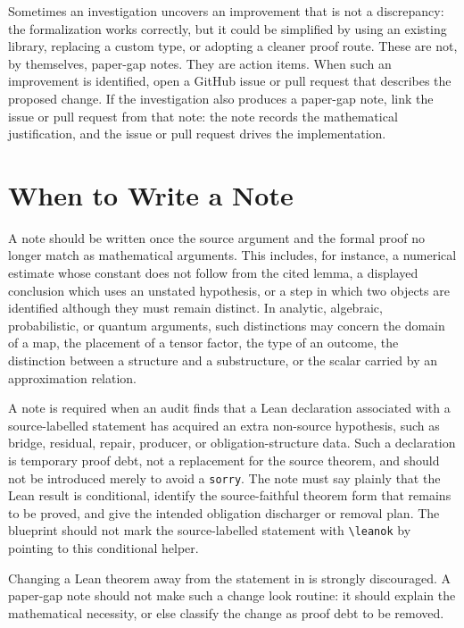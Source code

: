 \documentclass[11pt]{article}
\begin{document}
Sometimes an investigation uncovers an improvement that is not a discrepancy:
the formalization works correctly, but it could be simplified by using an
existing library, replacing a custom type, or adopting a cleaner proof route.
These are not, by themselves, paper-gap notes.  They are action items.  When
such an improvement is identified, open a GitHub issue or pull request that
describes the proposed change.  If the investigation also produces a paper-gap
note, link the issue or pull request from that note: the note records the
mathematical justification, and the issue or pull request drives the
implementation.

\section{When to Write a Note}

A note should be written once the source argument and the formal proof no longer
match as mathematical arguments.  This includes, for instance, a numerical
estimate whose constant does not follow from the cited lemma, a displayed
conclusion which uses an unstated hypothesis, or a step in which two objects are
identified although they must remain distinct.  In analytic, algebraic,
probabilistic, or quantum arguments, such distinctions may concern the domain of
a map, the placement of a tensor factor, the type of an outcome, the distinction
between a structure and a substructure, or the scalar carried by an approximation
relation.

A note is required when an audit finds that a Lean declaration associated with a
source-labelled statement has acquired an extra non-source hypothesis, such as
bridge, residual, repair, producer, or obligation-structure data.  Such a
declaration is temporary proof debt, not a replacement for the source theorem,
and should not be introduced merely to avoid a \verb|sorry|.  The note must say
plainly that the Lean result is conditional, identify the source-faithful theorem
form that remains to be proved, and give the intended obligation discharger or
removal plan.  The blueprint should not mark the source-labelled statement with
\verb|\leanok| by pointing to this conditional helper.

Changing a Lean theorem away from the statement in
 is strongly discouraged.  A paper-gap note should
not make such a change look routine: it should explain the mathematical
necessity, or else classify the change as proof debt to be removed.
\end{document}
